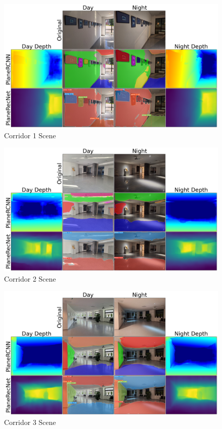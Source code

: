 \begin{figure}[H]
    \centering
    \includegraphics[width=1.0\textwidth]{images/results/Corridor_1.png}
    \caption{Corridor 1 Scene}
    \label{figure:Corridor_1}
\end{figure}

\begin{figure}[H]
    \centering
    \includegraphics[width=1.0\textwidth]{images/results/Corridor_2.png}
    \caption{Corridor 2 Scene}
    \label{figure:Corridor_2}
\end{figure}

\begin{figure}[H]
    \centering
    \includegraphics[width=1.0\textwidth]{images/results/Corridor_3.png}
    \caption{Corridor 3 Scene}
    \label{figure:Corridor_3}
\end{figure}

